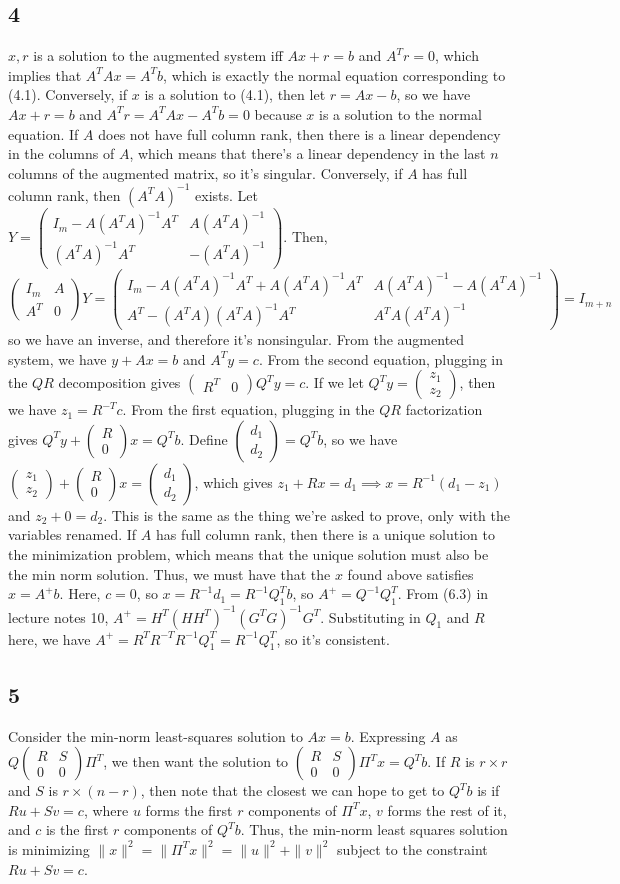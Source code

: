 \documentclass{article}
\newcommand{\openm}{\begin{pmatrix}}
\newcommand{\closem}{\end{pmatrix}}
\begin{document}
\subsection*{4}
$x,r$ is a solution to the augmented system iff $Ax+r=b$ and $A^Tr=0$, which implies that $A^TAx=A^Tb$, which is exactly the normal equation corresponding to (4.1). Conversely, if $x$ is a solution to (4.1), then let $r=Ax-b$, so we have $Ax+r=b$ and $A^Tr=A^TAx-A^Tb=0$ because $x$ is a solution to the normal equation.
If $A$ does not have full column rank, then there is a linear dependency in the columns of $A$, which means that there's a linear dependency in the last $n$ columns of the augmented matrix, so it's singular. Conversely, if $A$ has full column rank, then $(A^TA)^{-1}$ exists. Let $Y=\openm I_m-A(A^TA)^{-1}A^T&A(A^TA)^{-1}\\(A^TA)^{-1}A^T&-(A^TA)^{-1}\closem$. Then, 
\[
    \openm I_m&A\\A^T&0\closem Y=\openm I_m-A(A^TA)^{-1}A^T+A(A^TA)^{-1}A^T&A(A^TA)^{-1}-A(A^TA)^{-1}\\A^T-(A^TA)(A^TA)^{-1}A^T&A^TA(A^TA)^{-1}\closem=I_{m+n}
\]
so we have an inverse, and therefore it's nonsingular.
From the augmented system, we have $y+Ax=b$ and $A^Ty=c$. From the second equation, plugging in the $QR$ decomposition gives $\openm R^T&0\closem Q^Ty=c$. If we let $Q^Ty=\openm z_1\\z_2\closem$, then we have $z_1=R^{-T}c$. From the first equation, plugging in the $QR$ factorization gives $Q^Ty+\openm R\\0\closem x=Q^Tb$. Define $\openm d_1\\d_2\closem=Q^Tb$, so we have $\openm z_1\\z_2\closem+\openm R\\0\closem x=\openm d_1\\d_2\closem$, which gives $z_1+Rx=d_1\implies x=R^{-1}(d_1-z_1)$ and $z_2+0=d_2$. This is the same as the thing we're asked to prove, only with the variables renamed.
If $A$ has full column rank, then there is a unique solution to the minimization problem, which means that the unique solution must also be the min norm solution. Thus, we must have that the $x$ found above satisfies $x=A^+b$. Here, $c=0$, so $x=R^{-1}d_1=R^{-1}Q_1^Tb$, so $A^+=Q^{-1}Q_1^T$. From (6.3) in lecture notes 10, $A^+=H^T(HH^T)^{-1}(G^TG)^{-1}G^T$. Substituting in $Q_1$ and $R$ here, we have $A^+=R^TR^{-T}R^{-1}Q_1^T=R^{-1}Q_1^T$, so it's consistent.
\subsection*{5}
Consider the min-norm least-squares solution to $Ax=b$. Expressing $A$ as $Q\openm R&S\\0&0\closem\Pi^T$, we then want the solution to $\openm R&S\\0&0\closem\Pi^Tx=Q^Tb$. If $R$ is $r\times r$ and $S$ is $r\times(n-r)$, then note that the closest we can hope to get to $Q^Tb$ is if $Ru+Sv=c$, where $u$ forms the first $r$ components of $\Pi^Tx$, $v$ forms the rest of it, and $c$ is the first $r$ components of $Q^Tb$. Thus, the min-norm least squares solution is minimizing $\|x\|^2=\|\Pi^Tx\|^2=\|u\|^2+\|v\|^2$ subject to the constraint $Ru+Sv=c$. 
\end{document}
